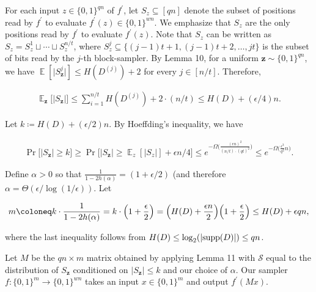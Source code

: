 \documentclass[10pt,a4paper]{article}
\begin{document}
For each input $z\in\{0,1\}^{qn}$ of $f^{\prime}$, let $S_{z}\subseteq[qn]$ denote the subset of positions read by $f^{\prime}$ to evaluate $f^{\prime}(z)\in\{0,1\}^{wn}$.
We emphasize that $S_{z}$ are the only positions read by $f^{\prime}$ to evaluate $f^{\prime}(z)$.
Note that $S_{z}$ can be written as $S_{z}=S_{z}^{1}\sqcup\cdots\sqcup S_{z}^{n/t}$, where $S_{z}^{j}\subseteq\{(j-1)t+1,(j-1)t+2,\dots,jt\}$ is the subset of bits read by the $j$-th block-sampler.
By Lemma 10, for a uniform $\boldsymbol{z}\sim\{0,1\}^{qn}$, we have $\operatorname{\mathbb{E}}[\lvert S_{\boldsymbol{z}}^{j}\rvert]\leq H(D^{(j)})+2$ for every $j\in[n/t]$.
Therefore,\par


\[\begin{gathered}
\displaystyle\operatorname{\mathbb{E}}_{\boldsymbol{z}}\bigl[\lvert S_{\boldsymbol{z}}\rvert\bigr]\leq\sum_{i=1}^{n/t}H(D^{(j)})+2\cdot(n/t)\leq H(D)+(\epsilon/4)n.
\end{gathered}\]


Let $k\coloneq H(D)+(\epsilon/2)n$.
By Hoeffding’s inequality, we have\par


\[\begin{gathered}
\displaystyle\Pr\bigl[\lvert S_{\boldsymbol{z}}\rvert\geq k\bigr]\geq\Pr\bigl[\lvert S_{\boldsymbol{z}}\rvert\geq\operatorname{\mathbb{E}}_{z}[\lvert S_{z}\rvert]+\epsilon n/4\bigr]\leq e^{-\Omega\bigl(\frac{(\epsilon n)^{2}}{(n/t)\cdot(qt)^{2}}\bigr)}\leq e^{-\Omega\bigl(\frac{\epsilon^{3}}{q^{2}}n\bigr)}.
\end{gathered}\]


Define $\alpha>0$ so that $\frac{1}{1-2h(\alpha)}=(1+\epsilon/2)$ (and therefore $\alpha=\Theta(\epsilon/\log(1/\epsilon))$.
Let\par


\[\begin{gathered}
m\coloneq k\cdot\frac{1}{1-2h(\alpha)}=k\cdot\Bigl(1+\frac{\epsilon}{2}\Bigr)=\Bigl(H(D)+\frac{\epsilon n}{2}\Bigr)\Bigl(1+\frac{\epsilon}{2}\Bigr)\leq H(D)+\epsilon qn,
\end{gathered}\]


where the last inequality follows from $H(D)\leq\log_{2}(\lvert{\rm supp}(D)\rvert)\leq qn$.\par




Let $M$ be the $qn\times m$ matrix obtained by applying Lemma 11 with $\mathcal{S}$ equal to the distribution of $S_{\boldsymbol{z}}$ conditioned on $\lvert S_{\boldsymbol{z}}\rvert\leq k$ and our choice of $\alpha$.
Our sampler $f\colon\{0,1\}^{m}\to\{0,1\}^{wn}$ takes an input $x\in\{0,1\}^{m}$ and output $f^{\prime}(Mx)$.\par
\end{document}
